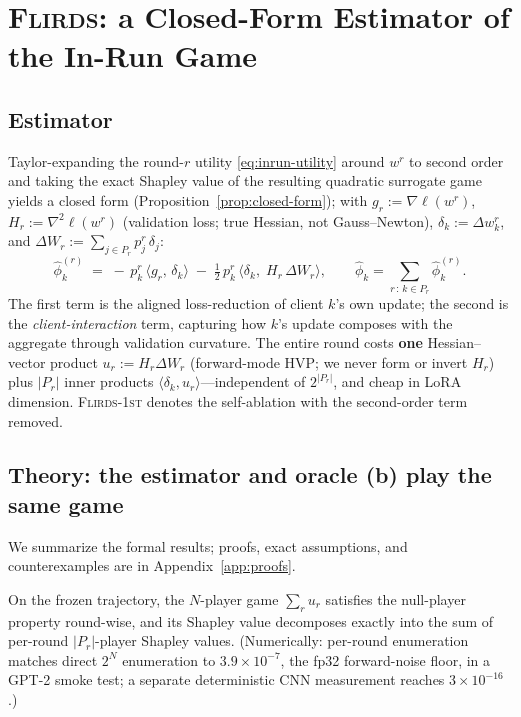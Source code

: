 \section{\textsc{Flirds}: a Closed-Form Estimator of the In-Run Game}
\label{sec:method}

\subsection{Estimator}
Taylor-expanding the round-$r$ utility \eqref{eq:inrun-utility} around $w^r$ to
second order and taking the exact Shapley value of the resulting quadratic
surrogate game yields a closed form (Proposition~\ref{prop:closed-form}); with
$g_r := \nabla \ell(w^r)$, $H_r := \nabla^2 \ell(w^r)$ (validation loss;
true Hessian, not Gauss--Newton), $\delta_k := \Delta w_k^r$, and
$\Delta W_r := \sum_{j \in P_r} p_j^r\, \delta_j$:
\begin{equation}
\hat\phi_k^{(r)}
\;=\;
-\,p_k^r\, \big\langle g_r,\, \delta_k \big\rangle
\;-\; \tfrac{1}{2}\, p_k^r\, \big\langle \delta_k,\; H_r\, \Delta W_r \big\rangle,
\qquad
\hat\phi_k = \sum_{r\,:\,k\in P_r} \hat\phi_k^{(r)}.
\label{eq:flirds}
\end{equation}
The first term is the aligned loss-reduction of client $k$'s own update; the
second is the \emph{client-interaction} term, capturing how $k$'s update composes
with the aggregate through validation curvature. The entire round costs
\textbf{one} Hessian--vector product $u_r := H_r \Delta W_r$ (forward-mode HVP;
we never form or invert $H_r$) plus $|P_r|$ inner products $\langle \delta_k,
u_r\rangle$---independent of $2^{|P_r|}$, and cheap in LoRA dimension.
\textsc{Flirds-1st} denotes the self-ablation with the second-order term removed.

\subsection{Theory: the estimator and oracle (b) play the same game}
\label{sec:theory}

We summarize the formal results; proofs, exact assumptions, and counterexamples
are in Appendix~\ref{app:proofs}. 

\begin{proposition}\label{prop:decomp}
On the frozen trajectory, the $N$-player game $\sum_r u_r$ satisfies the
null-player property round-wise, and its Shapley value decomposes exactly into
the sum of per-round $|P_r|$-player Shapley values. (Numerically: per-round
enumeration matches direct $2^N$ enumeration to $3.9\times 10^{-7}$, the fp32
forward-noise floor, in a GPT-2 smoke test; a separate deterministic CNN
measurement reaches $3\times 10^{-16}$.)
\end{proposition}

